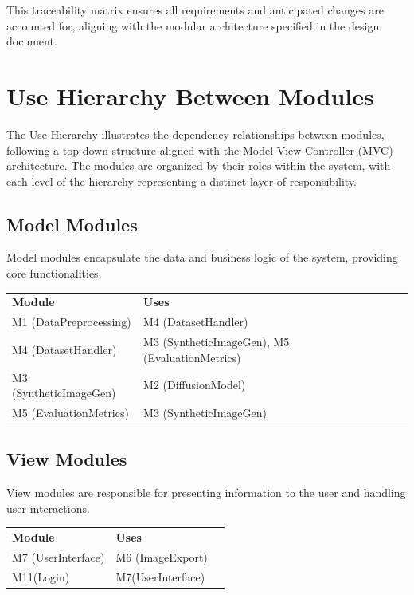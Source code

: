 \documentclass[12pt, titlepage]{article}
\begin{document}
This traceability matrix ensures all requirements and anticipated changes are accounted for, aligning with the modular architecture specified in the design document.



\section{Use Hierarchy Between Modules} \label{SecUse}

The Use Hierarchy illustrates the dependency relationships between modules, following a top-down structure aligned with the Model-View-Controller (MVC) architecture. The modules are organized by their roles within the system, with each level of the hierarchy representing a distinct layer of responsibility.

\subsection{Model Modules}
Model modules encapsulate the data and business logic of the system, providing core functionalities.

\begin{table}[H]
  \begin{tabular}{lllll}
  \textbf{Module} & \textbf{Uses} \\
  M1 (DataPreprocessing) & M4 (DatasetHandler)  \\
  M4 (DatasetHandler) & M3 (SyntheticImageGen), M5 (EvaluationMetrics) \\
  M3 (SyntheticImageGen) & M2 (DiffusionModel)  \\
  M5 (EvaluationMetrics) & M3 (SyntheticImageGen) 
  \end{tabular}
  \end{table}

\subsection{View Modules}
View modules are responsible for presenting information to the user and handling user interactions.

\begin{table}[H]
  \begin{tabular}{lll}
  \textbf{Module} & \textbf{Uses} &  \\
  M7 (UserInterface) & M6 (ImageExport) &  \\
  M11(Login) & M7(UserInterface) & 
  \end{tabular}
  \end{table}
\end{document}
